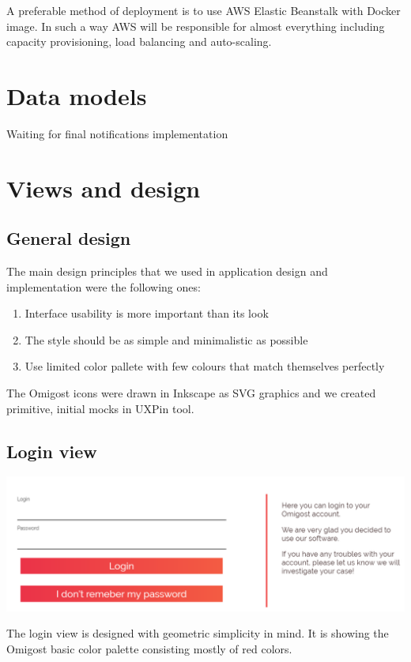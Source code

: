 \documentclass[licencjacka,en]{thesisclass}
\begin{document}
    A preferable method of deployment is to use AWS Elastic Beanstalk with Docker image.
    In such a way AWS will be responsible for almost everything including capacity provisioning, load balancing and auto-scaling.

    \section{Data models}
    Waiting for final notifications implementation
    \section{Views and design}
    
    \subsection{General design}
    
    The main design principles that we used in application design and implementation were the following ones:
    \begin{enumerate}
        \item Interface usability is more important than its look
        \item The style should be as simple and minimalistic as possible
        \item Use limited color pallete with few colours that match themselves perfectly        
    \end{enumerate}
    
    The Omigost icons were drawn in Inkscape as SVG graphics and we created primitive, initial mocks in UXPin \cite{UXPin} tool.
    
    \subsection{Login view}
    
    \includegraphics[width=\textwidth] {imgs/screenshots/screen_login.png}
  
    The login view is designed with geometric simplicity in mind. It is showing the Omigost basic color palette consisting mostly of red colors.
    
\end{document}
